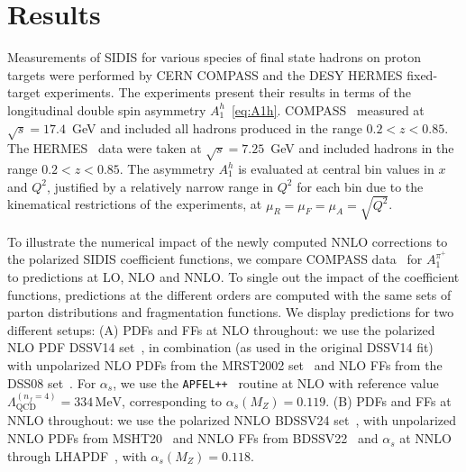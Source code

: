 \documentclass[10pt,aps,prl,twocolumn,preprintnumbers,nofootinbib]{revtex4-2}
\newcommand{\MeV}{\mathrm{MeV}}
\begin{document}
\section{Results}

Measurements of SIDIS for various species of final state hadrons
on proton targets were performed by 
CERN COMPASS \cite{COMPASS:2010hwr} and the DESY HERMES \cite{HERMES:2018awh} fixed-target 
experiments. The experiments present their results in 
terms of the longitudinal double spin asymmetry $A_1^h$~\eqref{eq:A1h}. COMPASS~\cite{COMPASS:2010hwr} 
measured 
at $\sqrt{s}=17.4$~GeV
and included all hadrons produced in the 
range $0.2<z<0.85$. The HERMES~\cite{HERMES:2018awh} 
data were taken 
at $\sqrt{s}=7.25$~GeV and included hadrons in the range $0.2<z<0.85$.
 The asymmetry $A_1^h$ is evaluated at central bin values in $x$ and $Q^2$, justified by a relatively narrow range in $Q^2$ for each bin due to the kinematical restrictions of the experiments, at $\mu_R=\mu_F=\mu_A=\sqrt{Q^2}$.


To illustrate the 
numerical impact of the newly computed NNLO corrections to the 
polarized SIDIS coefficient functions, we compare COMPASS data~\cite{COMPASS:2010hwr}  for $A_1^{\pi^+}$ 
to predictions at  LO, NLO and NNLO. To single out the impact of the coefficient functions, 
predictions at the different orders are computed with the same 
sets of parton distributions and fragmentation functions. 
We display predictions 
for two different setups: 
(A) PDFs and FFs at NLO throughout: we use 
the polarized NLO PDF DSSV14 set~\cite{deFlorian:2014yva},
in combination (as used in the original 
DSSV14 fit) with unpolarized NLO PDFs from the 
MRST2002 set~\cite{Martin:2002aw} and NLO FFs from the 
DSS08 set~\cite{deFlorian:2007aj}.  For $\alpha_s$, we use the \texttt{APFEL++}~\cite{Bertone:2013vaa,Bertone:2017gds} routine at NLO with reference value $\Lambda^{(n_f=4)}_{\mathrm{QCD}}=334\, \MeV$, corresponding to $\alpha_s(M_Z)=0.119$. (B) PDFs and FFs at NNLO 
throughout: we use the polarized NNLO BDSSV24
set~\cite{Borsa:2024mss}, with unpolarized NNLO PDFs from 
MSHT20~\cite{Bailey:2020ooq} and NNLO FFs from
BDSSV22~\cite{Borsa:2022vvp} and $\alpha_s$ at NNLO through
 LHAPDF~\cite{Buckley:2014ana},  with $\alpha_s(M_Z)=0.118$.
\end{document}
